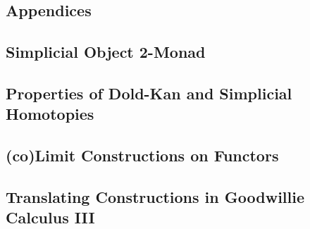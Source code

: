 \begin{subappendices}
    \section{Appendices}

    \subsection{Simplicial Object 2-Monad}\label{sec:simpMon}

    
    
    \subsection{Properties of Dold-Kan and Simplicial Homotopies}\label{sec:doldKan}

    


    \subsection{(co)Limit Constructions on Functors}\label{sec:colimFuncs}

    

    \subsection{Translating Constructions in Goodwillie Calculus III}\label{sec:transGoodwillie}

    
\end{subappendices}